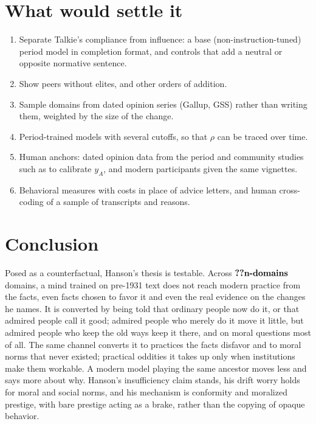 \documentclass[11pt]{article}
\makeatletter
\newcommand{\nv}[1]{\ifcsname n@#1\endcsname\csname n@#1\endcsname\else\textbf{??#1}\fi}
\makeatother
\begin{document}
\section{What would settle it}

\begin{enumerate}
\item Separate Talkie's compliance from influence: a base (non-instruction-tuned) period model in completion format, and controls that add a neutral or opposite normative sentence.
\item Show peers without elites, and other orders of addition.
\item Sample domains from dated opinion series (Gallup, GSS) rather than writing them, weighted by the size of the change.
\item Period-trained models with several cutoffs, so that $\rho$ can be traced over time.
\item Human anchors: dated opinion data from the period and community studies such as \cite{lynd1929middletown} to calibrate $y_A$, and modern participants given the same vignettes.
\item Behavioral measures with costs in place of advice letters, and human cross-coding of a sample of transcripts and reasons.
\end{enumerate}

\section{Conclusion}

Posed as a counterfactual, Hanson's thesis is testable.
Across $\nv{n-domains}$ domains, a mind trained on pre-1931 text does not reach modern practice from the facts, even facts chosen to favor it and even the real evidence on the changes he names.
It is converted by being told that ordinary people now do it, or that admired people call it good; admired people who merely do it move it little, but admired people who keep the old ways keep it there, and on moral questions most of all.
The same channel converts it to practices the facts disfavor and to moral norms that never existed; practical oddities it takes up only when institutions make them workable.
A modern model playing the same ancestor moves less and says more about why.
Hanson's insufficiency claim stands, his drift worry holds for moral and social norms, and his mechanism is conformity and moralized prestige, with bare prestige acting as a brake, rather than the copying of opaque behavior.
\end{document}
